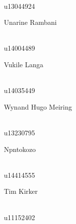 \documentclass[a4paper,12pt]{report}
\begin{document}
\begin{titlepage}
\begin{center}
\begin{minipage}{0.4\textwidth}
\end{minipage}
\begin{minipage}{0.4\textwidth}
\begin{flushright} \large
\emph{} \\
u13044924
\end{flushright}
\end{minipage}
\begin{minipage}{0.4\textwidth}
\begin{flushleft} \large
Unarine {Rambani}
\end{flushleft}
\end{minipage}
\begin{minipage}{0.4\textwidth}
\begin{flushright} \large
\emph{} \\
u14004489
\end{flushright}
\end{minipage}
\begin{minipage}{0.4\textwidth}
\begin{flushleft} \large
Vukile {Langa}
\end{flushleft}
\end{minipage}
\begin{minipage}{0.4\textwidth}
\begin{flushright} \large
\emph{} \\
u14035449 
\end{flushright}
\end{minipage}
\begin{minipage}{0.4\textwidth}
\begin{flushleft} \large
Wynand Hugo {Meiring}
\end{flushleft}
\end{minipage}
\begin{minipage}{0.4\textwidth}
\begin{flushright} \large
\emph{} \\
u13230795  
\end{flushright}
\end{minipage}
\begin{minipage}{0.4\textwidth}
\begin{flushleft} \large
Npntokozo
\end{flushleft}
\end{minipage}
\begin{minipage}{0.4\textwidth}
\begin{flushright} \large
\emph{} \\
u14414555
\end{flushright}
\end{minipage}
\begin{minipage}{0.4\textwidth}
\begin{flushleft} \large
Tim Kirker
\end{flushleft}
\end{minipage}
\begin{minipage}{0.4\textwidth}
\begin{flushright} \large
\emph{} \\
u11152402
\end{flushright}
\end{minipage}
\vfill


\end{center}
\end{titlepage}
\end{document}
